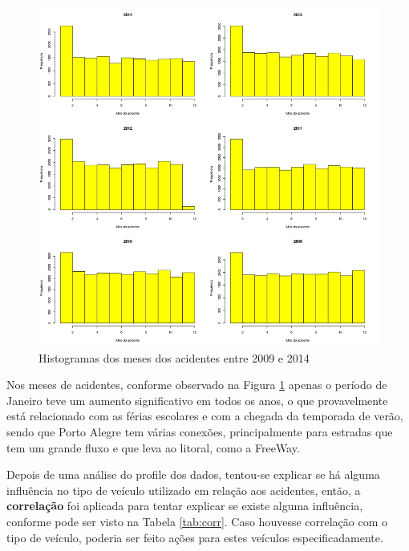 \documentclass[11pt,article,oneside,a4paper]{abntex2}
\begin{document}
\begin{figure}[h!]
	\caption{Histogramas dos meses dos acidentes entre 2009 e 2014} \label{fig:histmes}
    \includegraphics[width=\textwidth]{meses_acidentes.jpg}
\end{figure}

Nos meses de acidentes, conforme observado na Figura \ref{fig:histmes} apenas o período de Janeiro teve um aumento significativo em todos os anos, o que provavelmente está relacionado com as férias escolares e com a chegada da temporada de verão, sendo que Porto Alegre tem várias conexões, principalmente para estradas que tem um grande fluxo e que leva ao litoral, como a FreeWay.

Depois de uma análise do profile dos dados, tentou-se explicar se há alguma influência no tipo de veículo utilizado em relação aos acidentes, então, a \textbf{correlação} foi aplicada para tentar explicar se existe alguma influência, conforme pode ser visto na Tabela \ref{tab:corr}. Caso houvesse correlação com o tipo de veículo, poderia ser feito ações para estes veículos especificadamente.
\end{document}
